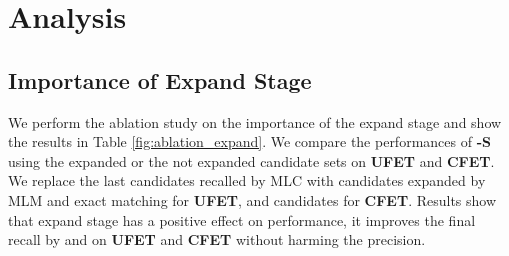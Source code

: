\documentclass[11pt]{article}
\begin{document}
 \section{Analysis}
\label{sec:analyze}
\subsection{Importance of Expand Stage}
We perform the ablation study on the importance of the expand stage and show the results in Table \ref{fig:ablation_expand}. We compare the performances of {\bf \textsc{\name-S}} using the expanded or the not expanded candidate sets on {\bf \textsc{UFET}} and {\bf \textsc{CFET}}. We replace the last  candidates recalled by MLC with candidates expanded by MLM and exact matching for {\bf \textsc{UFET}}, and  candidates for {\bf \textsc{CFET}}. Results show that expand stage has a positive effect on performance, it improves the final recall by  and  on  {\bf \textsc{UFET}} and {\bf \textsc{CFET}} without harming the precision.

\begin{table}[t]
\centering
{}
\caption{Ablation study of expand stage.}
\label{fig:ablation_expand}
\end{table}
\end{document}
